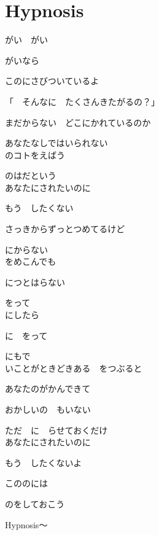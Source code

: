 \section{ Hypnosis}
\large{

がい　がい

がいなら

このにさびついているよ

「　そんなに　たくさんきたがるの？」

まだからない　どこにかれているのか

あなたなしではいられない
\\

のコトをえばう

のはだという
\\

あなたにされたいのに

もう　したくない

さっきからずっとつめてるけど

にからない
\\

をめこんでも

につとはらない

をって
\\

にしたら

に　をって

にもで
\\

いことがときどきある　をつぶると

あなたのがかんできて

おかしいの　もいない

ただ　に　らせておくだけ
\\

あなたにされたいのに

もう　したくないよ

こののには

のをしておこう

Hypnosis～

}